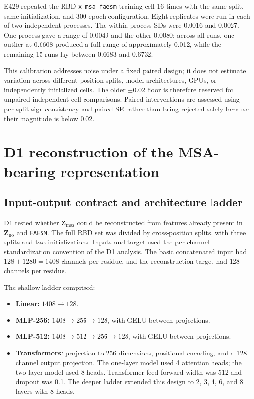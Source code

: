 \documentclass[10pt,a4paper]{article}
\newcommand{\Zno}{\mathbf{Z}_{\mathrm{no}}}
\newcommand{\Zmsa}{\mathbf{Z}_{\mathrm{msa}}}
\newcommand{\FAESM}{\texttt{FAESM}}
\begin{document}
E429 repeated the RBD \texttt{x\_msa\_faesm} training cell 16 times with the same split, same initialization, and 300-epoch configuration. Eight replicates were run in each of two independent processes. The within-process SDs were 0.0016 and 0.0027. One process gave a range of 0.0049 and the other 0.0080; across all runs, one outlier at 0.6608 produced a full range of approximately 0.012, while the remaining 15 runs lay between 0.6683 and 0.6732.

This calibration addresses noise under a fixed paired design; it does not estimate variation across different position splits, model architectures, GPUs, or independently initialized cells. The older $\pm0.02$ floor is therefore reserved for unpaired independent-cell comparisons. Paired interventions are assessed using per-split sign consistency and paired SE rather than being rejected solely because their magnitude is below 0.02.

\section{D1 reconstruction of the MSA-bearing representation}

\subsection{Input-output contract and architecture ladder}

D1 tested whether $\Zmsa$ could be reconstructed from features already present in $\Zno$ and \FAESM{}. The full RBD set was divided by cross-position splits, with three splits and two initializations. Inputs and target used the per-channel standardization convention of the D1 analysis. The basic concatenated input had $128+1280=1408$ channels per residue, and the reconstruction target had 128 channels per residue.

The shallow ladder comprised:

\begin{itemize}
    \item \textbf{Linear:} $1408\rightarrow128$.
    \item \textbf{MLP-256:} $1408\rightarrow256\rightarrow128$, with GELU between projections.
    \item \textbf{MLP-512:} $1408\rightarrow512\rightarrow256\rightarrow128$, with GELU between projections.
    \item \textbf{Transformers:} projection to 256 dimensions, positional encoding, and a 128-channel output projection. The one-layer model used 4 attention heads; the two-layer model used 8 heads. Transformer feed-forward width was 512 and dropout was 0.1. The deeper ladder extended this design to 2, 3, 4, 6, and 8 layers with 8 heads.
\end{itemize}
\end{document}
